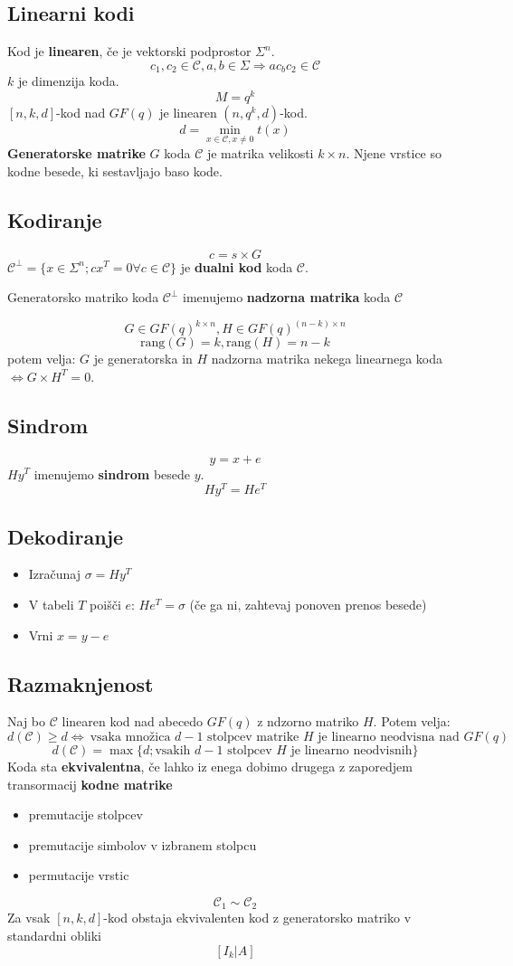 \begin{multicols}{5}
\section{Linearni kodi}
Kod je \textbf{linearen}, če je vektorski podprostor $\Sigma^n$.
\[c_1,c_2\in\mathcal{C}, a,b\in \Sigma\Rightarrow ac_bc_2\in \mathcal{C}\]
$k$ je dimenzija koda.
\[M = q^k\]
$[n,k,d]$-kod nad $GF(q)$ je linearen $(n,q^k,d)$-kod.
\[d = \min_{x\in \mathcal{C}, x\neq 0} t(x)\]
\textbf{Generatorske matrike} $G$ koda $\mathcal{C}$ je matrika velikosti $k\times n$.
Njene vrstice so kodne besede, ki sestavljajo baso kode.
\subsection{Kodiranje}
\[c = s\times G\]
$\mathcal{C}^\perp = \{x\in\Sigma^n; cx^T=0\forall c\in\mathcal{C}\}$ je \textbf{dualni kod} koda $\mathcal{C}$.

Generatorsko matriko koda $\mathcal{C}^\perp $ imenujemo \textbf{nadzorna matrika} koda $\mathcal{C}$

\[G\in GF(q)^{k\times n}, H\in GF(q)^{(n-k)\times n}\]
\[\text{rang}(G) = k, \text{rang}(H) = n-k\]
potem velja: $G$ je generatorska in $H$ nadzorna matrika nekega linearnega koda
$\Leftrightarrow G\times H^T=0$.
\subsection{Sindrom}
\[y = x+e\]
$Hy^T$ imenujemo \textbf{sindrom} besede $y$.
\[Hy^T = He^T\]
\subsection{Dekodiranje}
\begin{itemize}
	\item Izračunaj $\sigma = Hy^T$
	\item V tabeli $T$ poišči $e$: $He^T = \sigma$
		(če ga ni, zahtevaj ponoven prenos besede)
	\item Vrni $x = y-e$
\end{itemize}
\subsection{Razmaknjenost}
Naj bo $\mathcal{C}$ linearen kod nad abecedo $GF(q)$ z ndzorno matriko $H$.
Potem velja:
\[d(\mathcal{C})\ge d \Leftrightarrow\ \text{vsaka množica $d-1$ stolpcev matrike $H$ je linearno neodvisna nad $GF(q)$}\]
\[d(\mathcal{C}) = \max\{d;\text{vsakih $d-1$ stolpcev $H$ je linearno neodvisnih}\}\]
Koda sta \textbf{ekvivalentna}, če lahko iz enega dobimo drugega z zaporedjem transormacij \textbf{kodne matrike}
\begin{itemize}
	\item premutacije stolpcev
	\item premutacije simbolov v izbranem stolpcu
	\item permutacije vrstic
\end{itemize}
\[\mathcal{C}_1\sim\mathcal{C}_2\]
Za vsak $[n,k,d]$-kod obstaja ekvivalenten kod z generatorsko matriko v standardni obliki
\[[I_k|A]\]

\end{multicols}
